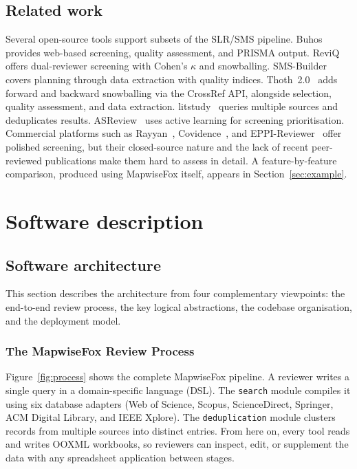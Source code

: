 \documentclass[preprint,12pt, a4paper]{elsarticle}
\begin{document}
\subsection{Related work}

Several open-source tools support subsets of the SLR/SMS pipeline.
Buhos~\cite{buhos2018} provides web-based screening, quality assessment, and
PRISMA output. ReviQ~\cite{reviq2026} offers dual-reviewer screening with
Cohen's $\kappa$ and snowballing. SMS-Builder~\cite{smsbuilder2022} covers
planning through data extraction with quality indices. Thoth~2.0~\cite{thoth2025}
adds forward and backward snowballing via the CrossRef API, alongside selection,
quality assessment, and data extraction. litstudy~\cite{litstudy2022}
queries multiple sources and deduplicates results. ASReview~\cite{van2021}
uses active learning for screening prioritisation. Commercial platforms such
as Rayyan~\cite{rayyan2016}, Covidence~\cite{covidence}, and
EPPI-Reviewer~\cite{thomas2010} offer polished screening, but their
closed-source nature and the lack of recent peer-reviewed publications make
them hard to assess in detail. A feature-by-feature comparison, produced using
MapwiseFox itself, appears in Section~\ref{sec:example}.


\section{Software description}

\subsection{Software architecture}

This section describes the architecture from four complementary
viewpoints: the end-to-end review process, the key logical abstractions,
the codebase organisation, and the deployment model.

\subsubsection{The MapwiseFox Review Process}

Figure~\ref{fig:process} shows the complete MapwiseFox pipeline. A
reviewer writes a single query in a domain-specific language (DSL). The
\texttt{search} module compiles it using six database adapters (Web of
  Science, Scopus, ScienceDirect, Springer, ACM Digital Library, and IEEE
Xplore). The \texttt{deduplication} module clusters records from multiple sources into
distinct entries. From here on, every tool reads and writes OOXML workbooks, so
reviewers can inspect, edit, or supplement the data with any spreadsheet
application between stages.
\end{document}

